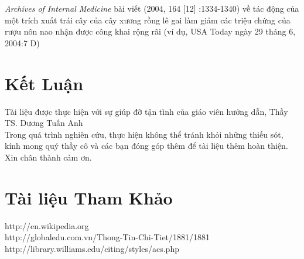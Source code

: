 \documentclass{hcmutarticle}
\begin{document}
{\itshape Archives of Internal Medicine} bài viết (2004, 164 [12] :1334-1340) về tác động của một trích xuất trái cây của cây xương rồng lê gai làm giảm các triệu chứng của rượu nôn nao nhận được công khai rộng rãi (ví dụ, USA Today ngày 29 tháng 6, 2004:7 D)



\section{Kết Luận }\label{result}
Tài liệu được thực hiện  với sự giúp đỡ tận tình của giáo viên hướng dẫn, Thầy TS. Dương Tuấn Anh\\
Trong quá trình nghiên cứu, thực hiện không thể tránh khỏi những  thiếu sót, kính mong quý thầy  cô và các bạn đóng góp thêm để tài liệu thêm hoàn thiện.\\
Xin chân thành cảm ơn.




\section{Tài liệu Tham Khảo }





http://en.wikipedia.org\\
http://globaledu.com.vn/Thong-Tin-Chi-Tiet/1881/1881\\
http://library.williams.edu/citing/styles/acs.php\\

\end{document}
